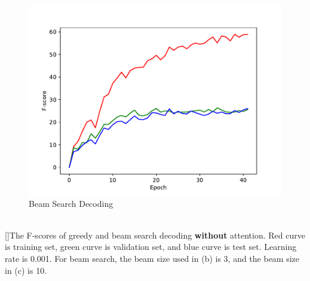 \documentclass[11pt,a4paper]{article}
\begin{document}
\begin{table}[ht]
\begin{subfigure}{0.3\textwidth}\centering\includegraphics[width=1.0\columnwidth]{fig_lrn_0p001_beam_10_f.pdf}\caption{Beam Search Decoding}\label{fig:tabf}\end{subfigure} \\
[]{The F-scores of greedy and beam search decoding \textbf{without} attention. Red curve is training set, green curve is validation set, and blue curve is test set. Learning rate is 0.001. For beam search, the beam size used in (b) is 3, and the beam size in (c) is 10.}
\label{fig:no_attn_losses_fscore}
\end{table}



    

\end{document}
